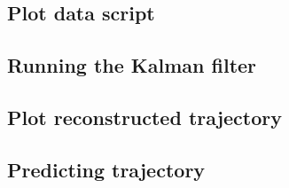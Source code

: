 \subsection{Plot data script}


\subsection{Running the Kalman filter}\label{app:runkalman}


\subsection{Plot reconstructed trajectory}\label{app:reconstruct}


\subsection{Predicting trajectory}\label{app:predict}


\pagebreak




